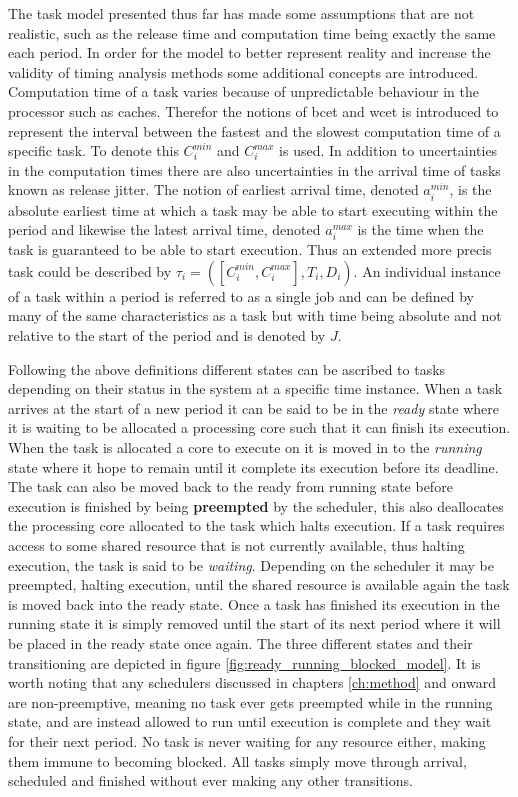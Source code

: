 \documentclass{kththesis}
\begin{document}
The task model presented thus far has made some assumptions that are not realistic, such as the
release time and computation time being exactly the same each period. In order for the model to
better represent reality and increase the validity of timing analysis methods some additional
concepts are introduced. Computation time of a task varies because of unpredictable behaviour in the
processor such as caches. Therefor the notions of \acrfull{bcet} and \acrfull{wcet} is introduced to
represent the interval between the fastest and the slowest computation time of a specific task. To
denote this $ C_i^{min} $ and $ C_i^{max} $ is used. In addition to uncertainties in the computation
times there are also uncertainties in the arrival time of tasks known as release jitter. The notion
of earliest arrival time, denoted $ a_i^{min} $, is the  absolute earliest time at which a task may
be able to start executing within the period and likewise the latest arrival time, denoted $
a_i^{max} $ is the time when the task is guaranteed to be able to start execution. Thus an extended
more precis task could be described by $ \tau_i = ( [C_i^{min}, C_i^{max}], T_i, D_i) $. An
individual instance of a task within a period is referred to as a single job and can be defined by
many of the same characteristics as a task but with time being absolute and not relative to the
start of the period and is denoted by $J$.

Following the above definitions different states can be ascribed to tasks depending on their
status in the system at a specific time instance. When a task arrives at the start of a new period
it can be said to be in the \textit{ready} state where it is waiting to be allocated a processing
core such that it can finish its execution. When the task is allocated a core to execute on it is
moved in to the \textit{running} state where it hope to remain until it complete its execution
before its deadline. The task can also be moved back to the ready from running state before
execution is finished by being \textbf{preempted} by the scheduler, this also deallocates the
processing core allocated to the task which halts execution. If a task requires access to
some shared resource that is not currently available, thus halting execution, the task is said to be
\textit{waiting}. Depending on the scheduler it may be preempted, halting execution, until the
shared resource is available again the task is moved back into the ready state. Once a task has
finished its execution in the running state it is simply removed until the start of its next period
where it will be placed in the ready state once again. The three different states
and their transitioning are depicted in figure \ref{fig:ready_running_blocked_model}. It is worth
noting that any schedulers discussed in chapters \ref{ch:method} and onward are non-preemptive,
meaning no task ever gets preempted while in the running state, and are instead allowed to run until
execution is complete and they wait for their next period. No task is never waiting for any resource
either, making them immune to becoming blocked. All tasks simply move through arrival, scheduled and
finished without ever making any other transitions. 
\end{document}

